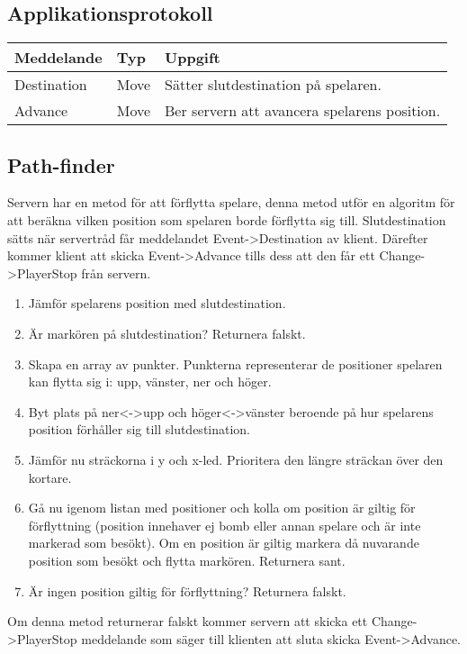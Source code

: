 \documentclass[10pt, titlepage, oneside, a4paper]{article}
\begin{document}
    	\subsection{Applikationsprotokoll}
    	\begin{tabular}{l | l | l |}
    
    	Meddelande & Typ & Uppgift\\ 
    	\hline 
    	Destination & Move & Sätter slutdestination på spelaren. \\ 
    	Advance & Move & Ber servern att avancera spelarens position.\\
    	\end{tabular} 
    	\subsection{Path-finder}
    	Servern har en metod för att förflytta spelare, denna metod utför en algoritm för att beräkna vilken position som spelaren borde förflytta sig till. Slutdestination sätts när servertråd får meddelandet Event->Destination av klient. Därefter kommer klient att skicka Event->Advance tills dess att den får ett Change->PlayerStop från servern.
    	
    		\begin{enumerate}
    			\item Jämför spelarens position med slutdestination. 
    			\item Är markören på slutdestination? Returnera falskt.
    			\item Skapa en array av punkter. Punkterna representerar de positioner spelaren kan flytta sig i: upp, vänster, ner och höger.
    			\item Byt plats på ner<->upp och höger<->vänster beroende på hur spelarens position förhåller sig till slutdestination.
    			\item Jämför nu sträckorna i y och x-led. Prioritera den längre sträckan över den kortare. 
    			\item Gå nu igenom listan med positioner och kolla om position är giltig för förflyttning (position innehaver ej bomb eller annan spelare och är inte markerad som besökt). Om en position är giltig markera då nuvarande position som besökt och flytta markören. Returnera sant.
    			\item Är ingen position giltig för förflyttning? Returnera falskt.
    			 
    		\end{enumerate}
    	Om denna metod returnerar falskt kommer servern att skicka ett Change->PlayerStop meddelande som säger till klienten att sluta skicka Event->Advance.
\end{document}
